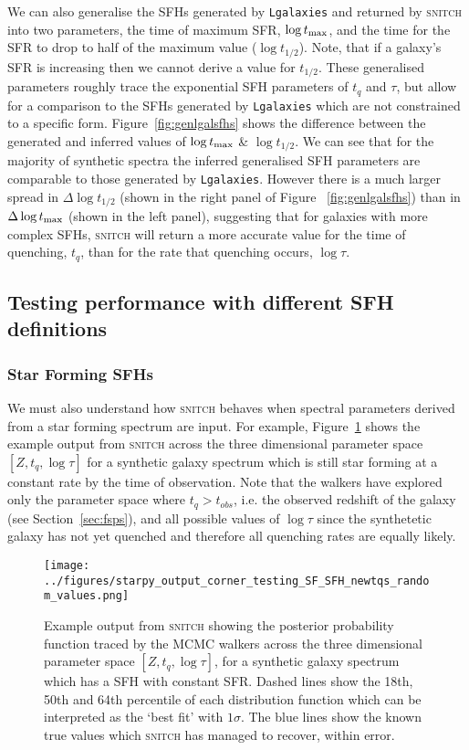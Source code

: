 \documentclass[useAMS,usenatbib]{mn2e}
\begin{document}
We can also generalise the SFHs generated by \texttt{Lgalaxies} and returned by \textsc{snitch} into two parameters, the time of maximum SFR, $\log t_{\rm{max}}$, and the time for the SFR to drop to half of the maximum value ($\log t_{1/2}$). Note, that if a galaxy's SFR is increasing then we cannot derive a value for $t_{1/2}$. These generalised parameters roughly trace the exponential SFH parameters of $t_q$ and $\tau$, but allow for a comparison to the SFHs generated by \texttt{Lgalaxies} which are not constrained to a specific form. Figure~\ref{fig:genlgalsfhs} shows the difference between the generated and inferred values of $\log t_{\rm{max}}$ \& $\log t_{1/2}$. We can see that for the majority of synthetic spectra the inferred generalised SFH parameters are comparable to those generated by \texttt{Lgalaxies}. However there is a much larger spread in $\Delta \log t_{1/2}$ (shown in the right panel of Figure ~\ref{fig:genlgalsfhs}) than in $\Delta \log t_{\rm{max}}$ (shown in the left panel), suggesting that for galaxies with more complex SFHs, \textsc{snitch} will return a more accurate value for the time of quenching, $t_q$, than for the rate that quenching occurs, $\log \tau$.



\subsection{Testing performance with different SFH definitions}\label{sec:diffSFHs}

\subsubsection{Star Forming SFHs}\label{secsec:starforming}

We must also understand how \textsc{snitch} behaves when spectral parameters derived from a star forming spectrum are input. For example, Figure~\ref{fig:sfgal} shows the example output from \textsc{snitch} across the three dimensional parameter space $[Z,t_q,\log \tau]$ for a synthetic galaxy spectrum which is still star forming at a constant rate by the time of observation. Note that the walkers have explored only the parameter space where $t_q > t_{obs}$, i.e. the observed redshift of the galaxy (see Section~\ref{sec:fsps}), and all possible values of $\log \tau$ since the synthetetic galaxy has not yet quenched and therefore all quenching rates are equally likely.  

\begin{figure}
\centering
\texttt{[image: ../figures/starpy\_output\_corner\_testing\_SF\_SFH\_newtqs\_random\_values.png]}
\caption{Example output from \textsc{snitch} showing the posterior probability function traced by the MCMC walkers across the three dimensional parameter space $[Z,t_q,\log \tau]$, for a synthetic galaxy spectrum which has a SFH with constant SFR.  Dashed lines show the 18th, 50th and 64th percentile of each distribution function which can be interpreted as the `best fit' with $1\sigma$. The blue lines show the known true values which \textsc{snitch} has managed to recover, within error. }
\label{fig:sfgal}
\end{figure}
\end{document}
